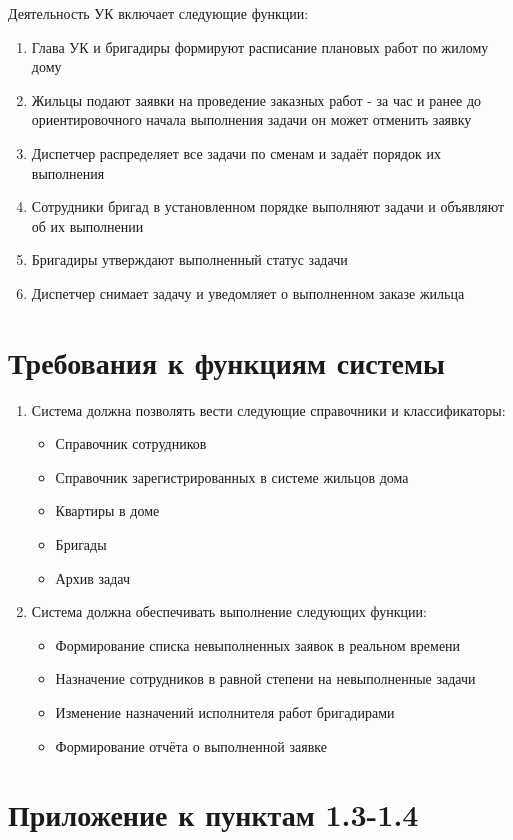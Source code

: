Деятельность УК включает следующие функции:
\begin{enumerate}
\item Глава УК и бригадиры формируют расписание плановых работ по жилому дому
\item Жильцы подают заявки на проведение заказных работ - за час и ранее до ориентировочного начала выполнения задачи он может отменить заявку
\item Диспетчер распределяет все задачи по сменам и задаёт порядок их выполнения 
\item Сотрудники бригад в установленном порядке выполняют задачи и объявляют об их выполнении
\item Бригадиры утверждают выполненный статус задачи
\item Диспетчер снимает задачу и уведомляет о выполненном заказе жильца
\end{enumerate}

\section{Требования к функциям системы}

\begin{enumerate}
\item Система должна позволять вести следующие справочники и классификаторы:
\begin{itemize}
\item Справочник сотрудников
\item Справочник зарегистрированных в системе жильцов дома
\item Квартиры в доме
\item Бригады
\item Архив задач
\end{itemize}
\item Система должна обеспечивать выполнение следующих функции:
\begin{itemize}
\item Формирование списка невыполненных заявок в реальном времени
\item Назначение сотрудников в равной степени на невыполненные задачи 
\item Изменение назначений исполнителя работ бригадирами
\item Формирование отчёта о выполненной заявке
\end{itemize}
\end{enumerate}


\section{Приложение к пунктам 1.3-1.4}

